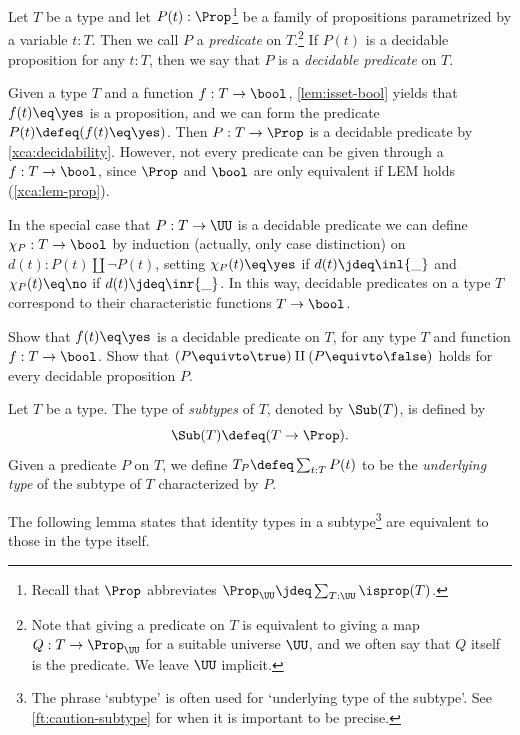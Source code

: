 \begin{definition}\label{def:predicate}
  Let $T$ be a type and let $P(t):\Prop$\footnote{%
    Recall that $\Prop$ abbreviates $\Prop_\UU \jdeq \sum_{T:\UU} \isprop(T)$.}
  be a family of propositions parametrized by a variable $t:T$.
  Then we call $P$ a \emph{predicate} on $T$.\footnote{%
    Note that giving a predicate on $T$ is
    equivalent to giving a map $Q: T\to\Prop_\UU$
    for a suitable universe $\UU$, and we often say that $Q$ itself is the
    predicate. We leave $\UU$ implicit.}
  If $P(t)$ is a decidable proposition for any $t:T$,
  then we say that $P$ is a \emph{decidable predicate} on $T$.
\end{definition}

Given a type $T$ and a function $f: T\to\bool$,
\cref{lem:isset-bool} yields that $f(t) \eq \yes$ is a
proposition, and we can form the predicate $P(t)\defeq (f(t) \eq \yes)$.
Then $P: T\to\Prop$ is a decidable predicate by \cref{xca:decidability}. 
However, not every predicate can be given through a $f: T\to\bool$, since
$\Prop$ and $\bool$ are only equivalent if LEM holds (\cref{xca:lem-prop}).

In the special case that $P: T\to\UU$ is a decidable predicate
we can define $\chi_P: T\to\bool$ by induction (actually, only case distinction)
on $d(t) :P(t)\amalg\neg P(t)$, setting $\chi_P(t) \eq \yes$
if $d(t)\jdeq\inl{\_}$ and $\chi_P(t) \eq \no$ if $d(t)\jdeq\inr{\_}$.
In this way, decidable predicates on a type $T$ correspond to
their characteristic functions $T\to\bool$.

\begin{xca}\label{xca:decidability}
Show that $f(t) \eq \yes$ is a decidable predicate on $T$,
for any type $T$ and function $f:T\to\bool$.
Show that $(P\equivto\true)\amalg(P\equivto\false)$ holds
for every decidable proposition $P$.
\end{xca}

\begin{definition}\label{def:subtype}
  Let $T$ be a type.
  The type of \emph{subtypes} of $T$,
  denoted by $\Sub(T)$, is defined by
  \[
  \Sub(T) \defeq (T\to\Prop).
  \]
  Given a predicate $P$ on $T$, we define $T_P\defeq \sum_{t:T} P(t)$
  to be the \emph{underlying type} of the subtype of $T$ characterized by $P$.
  \end{definition}

The following lemma states that identity types in a subtype\footnote{%
The phrase `subtype' is often used for `underlying type of the subtype'.
See \cref{ft:caution-subtype} for when it is important
to be precise.}
are equivalent to those in the type itself.

